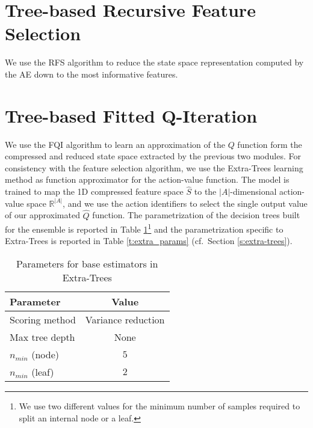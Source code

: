 
\section{Tree-based Recursive Feature Selection}
We use the RFS algorithm to reduce the state space representation computed by 
the AE down to the most informative features. 


\section{Tree-based Fitted Q-Iteration}
We use the FQI algorithm to learn an approximation of the $Q$ function form the
compressed and reduced state space extracted by the previous two modules. 
For consistency with the feature selection algorithm, we use the Extra-Trees 
learning method as function approximator for the action-value function.
The model is trained to map the 1D compressed feature space $\hat{S}$ to the 
$|A|$-dimensional action-value space $\mathbb{R}^{|A|}$, and we use the action 
identifiers to select the single output value of our approximated $\hat{Q}$ 
function. 
The parametrization of the decision trees built for the ensemble is reported in
Table \ref{t:tree_params}\footnote{We use two different values for the minimum 
number of samples required to split an internal node or a leaf.} and the
parametrization specific to Extra-Trees is reported in Table \ref{t:extra_params} 
(cf.\ Section \ref{s:extra-trees}).

%
\begin{table}[h]	
    \centering
    \begin{tabular}{l c} 
	\hline
	Parameter & Value \\ 
	\hline 
	Scoring method &  Variance reduction \\
	Max tree depth & None \\
	$n_{min}$ (node) & $5$\\
	$n_{min}$ (leaf) & $2$ \\
	\hline
    \end{tabular}
    \caption{Parameters for base estimators in Extra-Trees}
    \label{t:tree_params}
\end{table}
%

